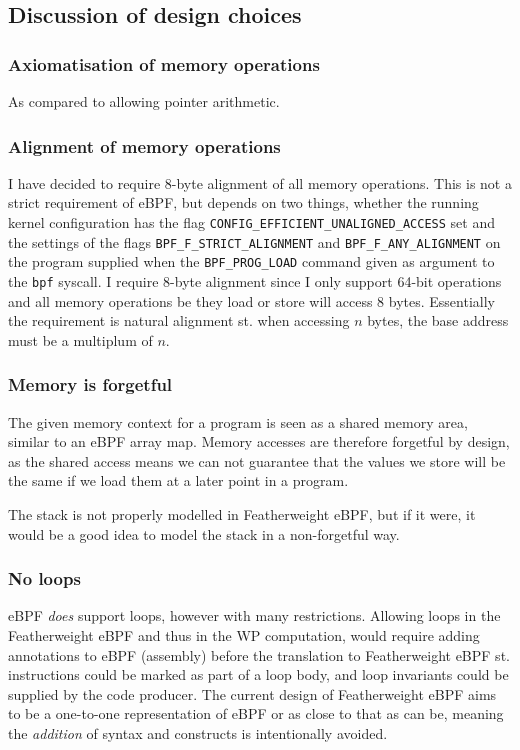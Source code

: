 \subsection{Discussion of design choices}
\label{subsec:discussion_of_design_choices}

\subsubsection*{Axiomatisation of memory operations}

As compared to allowing pointer arithmetic.

\subsubsection*{Alignment of memory operations}

I have decided to require 8-byte alignment of all memory operations. This is not a strict requirement of eBPF, but depends on two things, whether the running kernel configuration has the flag \texttt{CONFIG\_EFFICIENT\_UNALIGNED\_ACCESS} set and the settings of the flags \texttt{BPF\_F\_STRICT\_ALIGNMENT} and \texttt{BPF\_F\_ANY\_ALIGNMENT} on the program supplied when the \texttt{BPF\_PROG\_LOAD} command given as argument to the \texttt{bpf} syscall.
I require 8-byte alignment since I only support 64-bit operations and all memory operations be they load or store will access 8 bytes. Essentially the requirement is natural alignment st. when accessing $n$ bytes, the base address must be a multiplum of $n$. 

\subsubsection*{Memory is forgetful}

The given memory context for a program is seen as a shared memory area, similar to an eBPF array map. Memory accesses are therefore forgetful by design, as the shared access means we can not guarantee that the values we store will be the same if we load them at a later point in a program.

The stack is not properly modelled in Featherweight eBPF, but if it were, it would be a good idea to model the stack in a non-forgetful way. 

\subsubsection*{No loops}
eBPF \textit{does} support loops, however with many restrictions. Allowing loops in the Featherweight eBPF and thus in the WP computation, would require adding annotations to eBPF (assembly) before the translation to Featherweight eBPF st. instructions could be marked as part of a loop body, and loop invariants could be supplied by the code producer. The current design of Featherweight eBPF aims to be a one-to-one representation of eBPF or as close to that as can be, meaning the \textit{addition} of syntax and constructs is intentionally avoided. 


